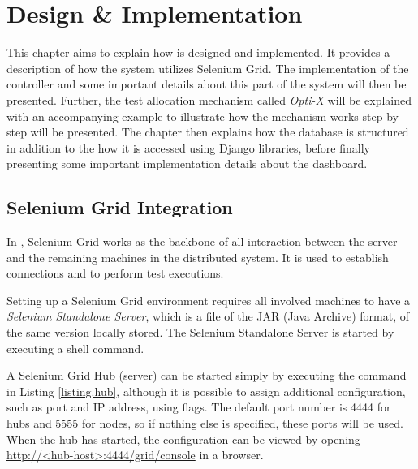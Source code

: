 \section{Design \& Implementation}\label{chapter.implementation}
\thispagestyle{plain}


This chapter aims to explain how \toolname \space is designed and implemented.  It  provides a description of how the system utilizes Selenium Grid. The implementation of the controller and some important details about this part of the system will then be presented. Further, the test allocation mechanism called \emph{Opti-X} will be explained with an accompanying example to illustrate how the mechanism works step-by-step will be presented. The chapter then explains how the database is structured in addition to the how it is accessed using Django libraries, before finally presenting some important implementation details about the dashboard.




\subsection{Selenium Grid Integration}\label{section.selenium}

In \toolname, Selenium Grid works as the backbone of all interaction between the server and the remaining machines in the distributed system. It is used to establish connections and to perform test executions.

Setting up a Selenium Grid environment requires all involved machines to have a \emph{Selenium Standalone Server}, which is a file of the JAR (Java Archive) format, of the same version locally stored. The Selenium Standalone Server is started by executing a shell command.

A Selenium Grid Hub (server) can be started simply by executing the command in Listing \ref{listing.hub}, although it is possible to assign additional configuration, such as port and IP address, using flags. The default port number is 4444 for hubs and 5555 for nodes, so if nothing else is specified, these ports will be used. When the hub has started, the configuration can be viewed by opening \url{http://<hub-host>:4444/grid/console} in a browser.


